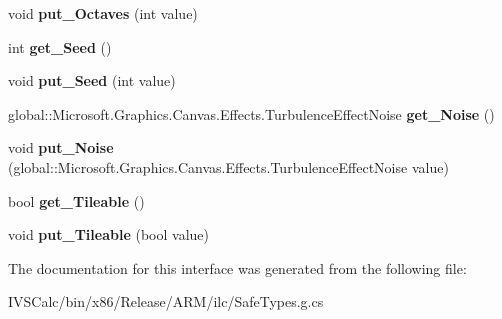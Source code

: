 \begin{DoxyCompactItemize}
void {\bfseries put\+\_\+\+Octaves} (int value)
\item 
\mbox{\label{interface_microsoft_1_1_graphics_1_1_canvas_1_1_effects_1_1_i_turbulence_effect_af5fd3f6139436ae5a010c68ce7ab071f}} 
int {\bfseries get\+\_\+\+Seed} ()
\item 
\mbox{\label{interface_microsoft_1_1_graphics_1_1_canvas_1_1_effects_1_1_i_turbulence_effect_a5c5d935930cc55a72aa9a22ade2046dd}} 
void {\bfseries put\+\_\+\+Seed} (int value)
\item 
\mbox{\label{interface_microsoft_1_1_graphics_1_1_canvas_1_1_effects_1_1_i_turbulence_effect_a0607d51d4941f076f4fd0bd3491f5589}} 
global\+::\+Microsoft.\+Graphics.\+Canvas.\+Effects.\+Turbulence\+Effect\+Noise {\bfseries get\+\_\+\+Noise} ()
\item 
\mbox{\label{interface_microsoft_1_1_graphics_1_1_canvas_1_1_effects_1_1_i_turbulence_effect_af647617d63b69c0e66e204d3dbc35129}} 
void {\bfseries put\+\_\+\+Noise} (global\+::\+Microsoft.\+Graphics.\+Canvas.\+Effects.\+Turbulence\+Effect\+Noise value)
\item 
\mbox{\label{interface_microsoft_1_1_graphics_1_1_canvas_1_1_effects_1_1_i_turbulence_effect_a60dd710286094ffebd50bbf6cbcb9ccd}} 
bool {\bfseries get\+\_\+\+Tileable} ()
\item 
\mbox{\label{interface_microsoft_1_1_graphics_1_1_canvas_1_1_effects_1_1_i_turbulence_effect_a16632357dcc2d4e3e5ab07c3eda97095}} 
void {\bfseries put\+\_\+\+Tileable} (bool value)
\end{DoxyCompactItemize}


The documentation for this interface was generated from the following file\+:\begin{DoxyCompactItemize}
\item 
I\+V\+S\+Calc/bin/x86/\+Release/\+A\+R\+M/ilc/Safe\+Types.\+g.\+cs\end{DoxyCompactItemize}
